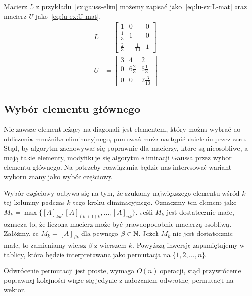 \documentclass[../main.tex]{subfiles}
\begin{document}
    \begin{example}
      Macierz \( L \) z przykładu~\ref{ex:gauss-elim} możemy zapisać jako~\ref{eq:lu-ex:L-mat}
      oraz macierz \( U \) jako~\ref{eq:lu-ex:U-mat}.
      \begin{align} \label{eq:lu-ex:L-mat}
        L &= \begin{bmatrix}
          1 & 0 & 0 \\
          \frac{1}{3} & 1 & 0 \\
          \frac{2}{3} & -\frac{1}{10} & 1 
        \end{bmatrix} \\
        U &= \begin{bmatrix} \label{eq:lu-ex:U-mat}
          3 & 4 & 2 \\
          0 & 6\frac{2}{3} & 6\frac{1}{3} \\
          0 & 0 & 2\frac{3}{10}
        \end{bmatrix}
      \end{align}
    \end{example}

    \subsection{Wybór elementu głównego}
    Nie zawsze element leżący na diagonali jest elementem, który można wybrać do obliczenia
    mnożnika eliminacyjnego, ponieważ może nastąpić dzielenie przez zero. Stąd, by algorytm
    zachowywał się poprawnie dla macierzy, które są nieosobliwe, a mają takie elementy, 
    modyfikuje się algorytm eliminacji Gaussa przez wybór elementu głównego. Na potrzeby
    rozwiązania będzie nas interesować wariant wyboru znany jako wybór częściowy.

    Wybór częściowy odbywa się na tym, że szukamy największego elementu wśród 
    \( k \)-tej kolumny podczas \( k \)-tego kroku eliminacyjnego. Oznaczmy ten element jako
    \( M_k = \max \{ [A]_{kk}, [A]_{(k+1)k}, \dotsc, [A]_{nk} \} \). Jeśli \( M_k \) jest
    dostatecznie małe, oznacza to, że liczona macierz może być prawdopodobnie macierzą
    osobliwą. Załóżmy, że \( M_k = [A]_{\beta k} \) dla pewnego \( \beta \in \mathbb{N} \).
    Jeżeli \( M_k \) nie jest dostatecznie małe, to zamieniamy wiersz \( \beta \) z wierszem \(k \).
    Powyższą inwersję zapamiętujemy w tablicy, która
    będzie interpretowana jako permutacja na \( \{ 1, 2, \dotsc, n \} \).

    Odwrócenie permutacji jest proste, wymaga \( O(n) \) operacji, stąd przywrócenie
    poprawnej kolejności wiąże się jedynie z nałożeniem odwrotnej permutacji na wektor.
\end{document}
